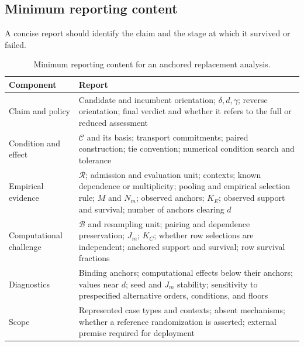 \documentclass[11pt]{article}
\newcommand{\Regime}{\mathcal{R}}
\newcommand{\CSet}{\mathcal{C}}
\newcommand{\Boot}{\mathcal{B}}
\theoremstyle{remark}
\begin{document}
\clearpage
\subsection{Minimum reporting content}

A concise report should identify the claim and the stage at which it survived
or failed.

\begin{table}[H]
\centering
\caption{Minimum reporting content for an anchored replacement analysis.}
\label{tab:reporting}
\begin{tabularx}{\textwidth}{@{}>{\raggedright\arraybackslash}p{}>{\raggedright\arraybackslash}X@{}}
\toprule
Component & Report \\
\midrule
Claim and policy & Candidate and incumbent orientation; $\delta,d,\gamma$; reverse orientation; final verdict and whether it refers to the full or reduced assessment \\
Condition and effect & $\CSet$ and its basis; transport commitments; paired construction; tie convention; numerical condition search and tolerance \\
Empirical evidence & $\Regime$; admission and evaluation unit; contexts; known dependence or multiplicity; pooling and empirical selection rule; $M$ and $N_m$; observed anchors; $K_E$; observed support and survival; number of anchors clearing $d$ \\
Computational challenge & $\Boot$ and resampling unit; pairing and dependence preservation; $J_m$; $K_C$; whether row selections are independent; anchored support and survival; row survival fractions \\
Diagnostics & Binding anchors; computational effects below their anchors; values near $d$; seed and $J_m$ stability; sensitivity to prespecified alternative orders, conditions, and floors \\
Scope & Represented case types and contexts; absent mechanisms; whether a reference randomization is asserted; external premise required for deployment \\
\bottomrule
\end{tabularx}
\end{table}
\end{document}
